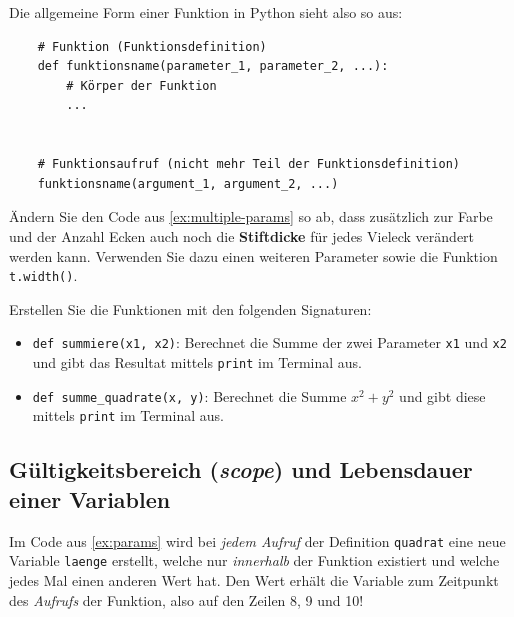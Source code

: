 \begin{myoverview}
	\medskip
	Die allgemeine Form einer Funktion in Python sieht also so aus:
	\begin{lstlisting}
	# Funktion (Funktionsdefinition)
	def funktionsname(parameter_1, parameter_2, ...):
		# Körper der Funktion
		...


	# Funktionsaufruf (nicht mehr Teil der Funktionsdefinition)
	funktionsname(argument_1, argument_2, ...)
	\end{lstlisting}
\end{myoverview}

\begin{myexercise}
	Ändern Sie den Code aus \cref{ex:multiple-params} so ab, dass zusätzlich zur Farbe und der Anzahl Ecken auch noch die \textbf{Stiftdicke} für jedes Vieleck verändert werden kann. Verwenden Sie dazu einen weiteren Parameter sowie die Funktion \lstinline|t.width()|.
	\begin{myanswer}
		
	\end{myanswer}
\end{myexercise}

\begin{myexercise}
	Erstellen Sie die Funktionen mit den folgenden Signaturen:
	\begin{itemize}
		\item \lstinline|def summiere(x1, x2)|: Berechnet die Summe der zwei Parameter \lstinline|x1| und \lstinline|x2| und gibt das Resultat mittels \lstinline|print| im Terminal aus.
		\item \lstinline|def summe_quadrate(x, y)|: Berechnet die Summe \(x^2 + y^2\) und gibt diese mittels \lstinline{print} im Terminal aus.
	\end{itemize}
	\begin{myanswer}
		
	\end{myanswer}
\end{myexercise}

\subsection{Gültigkeitsbereich (\textit{scope}) und Lebensdauer einer Variablen}
Im Code aus \cref{ex:params} wird bei \textit{jedem Aufruf} der Definition \lstinline|quadrat| eine neue Variable \texttt{laenge} erstellt, welche nur \textit{innerhalb} der Funktion existiert und welche jedes Mal einen anderen Wert hat. Den Wert erhält die Variable zum Zeitpunkt des \textit{Aufrufs} der Funktion, also auf den Zeilen 8, 9 und 10!

